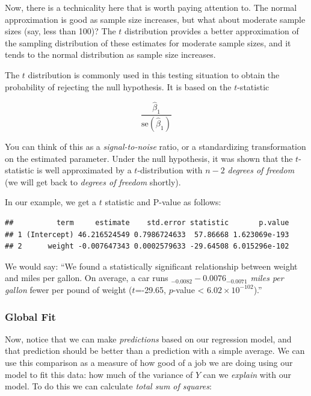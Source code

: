 \documentclass[]{article}
\newenvironment{Shaded}{\begin{snugshade}}{\end{snugshade}}
\newcommand{\KeywordTok}[1]{\textcolor[rgb]{0.13,0.29,0.53}{\textbf{{#1}}}}
\newcommand{\StringTok}[1]{\textcolor[rgb]{0.31,0.60,0.02}{{#1}}}
\newcommand{\NormalTok}[1]{{#1}}
\theoremstyle{definition}
\theoremstyle{definition}
\theoremstyle{remark}
\begin{document}
Now, there is a technicality here that is worth paying attention to. The
normal approximation is good as sample size increases, but what about
moderate sample sizes (say, less than 100)? The \(t\) distribution
provides a better approximation of the sampling distribution of these
estimates for moderate sample sizes, and it tends to the normal
distribution as sample size increases.

The \(t\) distribution is commonly used in this testing situation to
obtain the probability of rejecting the null hypothesis. It is based on
the \(t\)-statistic

\[
\frac{\hat{\beta}_1}{\mathrm{se}(\hat{\beta}_1)}
\]

You can think of this as a \emph{signal-to-noise} ratio, or a
standardizing transformation on the estimated parameter. Under the null
hypothesis, it was shown that the \(t\)-statistic is well approximated
by a \(t\)-distribution with \(n-2\) \emph{degrees of freedom} (we will
get back to \emph{degrees of freedom} shortly).

In our example, we get a \(t\) statistic and P-value as follows:

\begin{Shaded}
\end{Shaded}

\begin{verbatim}
##          term     estimate    std.error statistic       p.value
## 1 (Intercept) 46.216524549 0.7986724633  57.86668 1.623069e-193
## 2      weight -0.007647343 0.0002579633 -29.64508 6.015296e-102
\end{verbatim}

We would say: ``We found a statistically significant relationship
between weight and miles per gallon. On average, a car runs
\(_{-0.0082} -0.0076_{-0.0071}\) \emph{miles per gallon} fewer per pound
of weight (\(t\)=-29.65, \(p\)-value \textless{}
\(6.02\times 10^{-102}\)).''

\subsubsection{Global Fit}\label{global-fit}

Now, notice that we can make \emph{predictions} based on our regression
model, and that prediction should be better than a prediction with a
simple average. We can use this comparison as a measure of how good of a
job we are doing using our model to fit this data: how much of the
variance of \(Y\) can we \emph{explain} with our model. To do this we
can calculate \emph{total sum of squares}:
\end{document}
